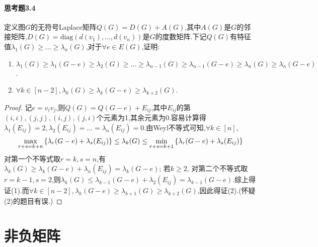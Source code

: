 \documentclass[11pt]{article}
\begin{document}
\paragraph{思考题3.4}定义图$G$的无符号Laplace矩阵$Q(G)=D(G)+A(G)$,其中$A(G)$是$G$的邻接矩阵,$D(G)=\mathrm{diag}(d(v_1),\dots,d(v_n))$是$G$的度数矩阵.下记$Q(G)$有特征值$\lambda_1(G)\geq\dots\geq\lambda_n(G)$,对于$\forall e\in E(G)$,证明:
\begin{enumerate}
    \item $\lambda_1(G)\geq \lambda_1(G-e)\geq \lambda_2(G)\geq \dots \geq \lambda_{n-1}(G)\geq \lambda_{n-1}(G-e)\geq \lambda_n(G)\geq \lambda_n(G-e)$.
    \item $\forall k\in [n-2], \lambda_k(G)\geq \lambda_k(G-e)\geq \lambda_{k+2}(G)$.
\end{enumerate}
\begin{proof}
    记$e=v_i v_j$,则$Q(G)=Q(G-e)+E_{ij}$,其中$E_{ij}$的第$(i,i), (j,j), (i,j), (j,i)$个元素为1,其余元素为0.容易计算得$\lambda_1(E_{ij})=2, \lambda_2(E_{ij})=\dots=\lambda_n(E_{ij})=0$.由Weyl不等式可知,$\forall k\in [n]$,
    $$\max_{r+s=k+n}\left\{\lambda_r(G-e)+\lambda_s(E_{ij})\right\}\leq \lambda_k(G)\leq \min_{r+s=k+1}\left\{\lambda_r(G-e)+\lambda_s(E_{ij})\right\}$$
    对第一个不等式取$r=k, s=n$,有$\lambda_k(G)\geq \lambda_k(G-e)+\lambda_n(E_{ij})=\lambda_k(G-e)$; 若$k\geq 2$, 对第二个不等式取$r=k-1, s=2$,则$\lambda_k(G)\leq \lambda_{k-1}(G-e)+\lambda_2(E_{ij})=\lambda_{k-1}(G-e)$.综上得证(1).而$\forall k\in [n-2], \lambda_k(G-e)\geq \lambda_{k+1}(G)\geq \lambda_{k+2}(G)$,因此得证(2).(怀疑(2)的题目有误.)
\end{proof}

\section{非负矩阵}
\end{document}
